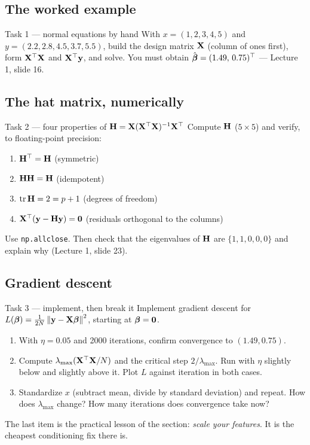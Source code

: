 \documentclass[11pt]{article}
\begin{document}
\subsection{The worked example}
\begin{task}{Task 1 --- normal equations by hand}
With $x=(1,2,3,4,5)$ and $y=(2.2,2.8,4.5,3.7,5.5)$, build the design matrix $\mathbf{X}$ (column of ones first),
form $\mathbf{X}^{\top}\mathbf{X}$ and $\mathbf{X}^{\top}\mathbf{y}$, and solve. You must obtain $\hat{\boldsymbol{\beta}}=(1.49,\,0.75)^{\top}$ --- Lecture 1, slide 16.
\end{task}

\subsection{The hat matrix, numerically}
\begin{task}{Task 2 --- four properties of $\mathbf{H}=\mathbf{X}(\mathbf{X}^{\top}\mathbf{X})^{-1}\mathbf{X}^{\top}$}
Compute $\mathbf{H}$ ($5\times5$) and verify, to floating-point precision:
\begin{enumerate}[nosep]
  \item $\mathbf{H}^{\top}=\mathbf{H}$ \hfill (symmetric)
  \item $\mathbf{H}\mathbf{H}=\mathbf{H}$ \hfill (idempotent)
  \item $\operatorname{tr}\mathbf{H}=2=p+1$ \hfill (degrees of freedom)
  \item $\mathbf{X}^{\top}(\mathbf{y}-\mathbf{H}\mathbf{y})=\mathbf{0}$ \hfill (residuals orthogonal to the columns)
\end{enumerate}
Use \texttt{np.allclose}. Then check that the eigenvalues of $\mathbf{H}$ are $\{1,1,0,0,0\}$ and explain why
(Lecture 1, slide 23).
\end{task}

\subsection{Gradient descent}
\begin{task}{Task 3 --- implement, then break it}
Implement gradient descent for $L(\boldsymbol{\beta})=\frac1{2N}\left\lVert \mathbf{y}-\mathbf{X}\boldsymbol{\beta} \right\rVert^2$, starting at $\boldsymbol{\beta}=\mathbf{0}$.
\begin{enumerate}[nosep]
  \item With $\eta=0.05$ and 2000 iterations, confirm convergence to $(1.49,0.75)$.
  \item Compute $\lambda_{\max}(\mathbf{X}^{\top}\mathbf{X}/N)$ and the critical step $2/\lambda_{\max}$. Run with $\eta$ slightly
        below and slightly above it. Plot $L$ against iteration in both cases.
  \item Standardize $x$ (subtract mean, divide by standard deviation) and repeat. How does $\lambda_{\max}$ change?
        How many iterations does convergence take now?
\end{enumerate}
\end{task}
The last item is the practical lesson of the section: \emph{scale your features}. It is the cheapest
conditioning fix there is.
\end{document}
